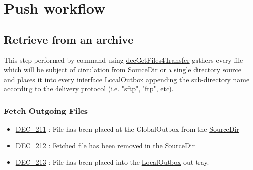 \documentclass[dec_sum_main.tex]{subfiles}
\begin{document}
\section{Push workflow}

\subsection{Retrieve from an archive}
This step performed by command using \hyperref[decGetFiles4Transfer]{decGetFiles4Transfer} gathers every file which will be subject of circulation from \hyperref[SourceDir]{SourceDir} or a single directory source and places it into every interface \hyperref[LocalOutbox]{LocalOutbox} appending the sub-directory name according to the delivery protocol (i.e. "sftp", "ftp", etc).

\subsubsection{Fetch Outgoing Files}

\begin{itemize}
    \item \hyperref[DEC212]{DEC\_211} : File has been placed at the GlobalOutbox from the \hyperref[SourceDir]{SourceDir}
    \item \hyperref[DEC212]{DEC\_212} : Fetched file has been removed in the \hyperref[SourceDir]{SourceDir}
    \item \hyperref[DEC213]{DEC\_213} : File has been placed into the \hyperref[LocalOutbox]{LocalOutbox} out-tray.
\end{itemize}
\end{document}
